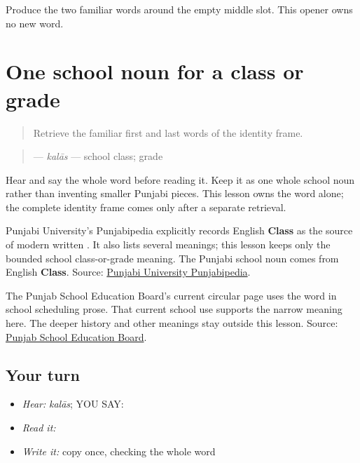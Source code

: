\begin{tcolorbox}[breakable,colback=teal!4,colframe=teal!35!black,title={Before you move on}]
Produce the two familiar words around the empty middle slot. This opener owns no new word.
\end{tcolorbox}
\section[\texorpdfstring{\pa{ਕਲਾਸ} (kalaas)}{ਕਲਾਸ (kalaas)}]{One school noun for a class or grade}

\label{lesson:PA-C201-class}



\begin{quote}
Retrieve the familiar first and last words of the identity frame.
\end{quote}

\begin{grammarlens}[title={Grammar Lens: direct owner}]
\begin{quote}
\textbf{} — \emph{kalās} — school class; grade
\end{quote}

Hear and say the whole word before reading it. Keep it as one whole school noun rather than inventing smaller Punjabi pieces. This lesson owns the word alone; the complete identity frame comes only after a separate retrieval.
\end{grammarlens}

\begin{cousinweb}
Punjabi University's Punjabipedia explicitly records English \textbf{Class} as the source of modern written \textbf{}. It also lists several meanings; this lesson keeps only the bounded school class-or-grade meaning. The Punjabi school noun comes from English \textbf{Class}. Source: \href{https://punjabipedia.org/topic.aspx?txt=\%E0\%A8\%95\%E0\%A8\%B2\%E0\%A8\%BE\%E0\%A8\%B8}{Punjabi University Punjabipedia}.

The Punjab School Education Board's current circular page uses the word in school scheduling prose. That current school use supports the narrow meaning here. The deeper history and other meanings stay outside this lesson. Source: \href{https://pseb.ac.in/public/pressnotescirculars}{Punjab School Education Board}.
\end{cousinweb}

\subsection*{Your turn}
\begin{itemize}
\raggedright
  \item \emph{Hear:} \emph{kalās}; YOU SAY: \textbf{}
  \item \emph{Read it:} \textbf{}
  \item \emph{Write it:} copy \textbf{} once, checking the whole word
\end{itemize}

